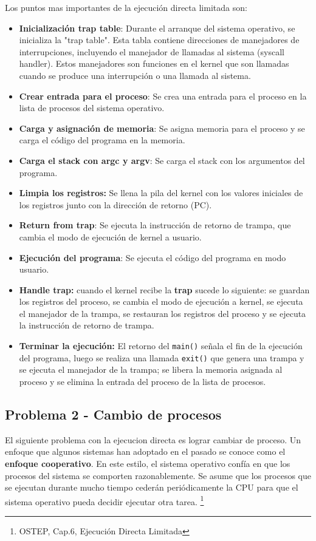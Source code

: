 \documentclass{article}
\begin{document}
Los puntos mas importantes de la ejecución directa limitada son:
\begin{itemize}
    \item \textbf{Inicialización trap table}: Durante el arranque del sistema operativo, se inicializa la "trap table". Esta tabla contiene direcciones de manejadores de interrupciones, incluyendo el manejador de llamadas al sistema (syscall handler). Estos manejadores son funciones en el kernel que son llamadas cuando se produce una interrupción o una llamada al sistema.
    \item \textbf{Crear entrada para el proceso}: Se crea una entrada para el proceso en la lista de procesos del sistema operativo.
    \item \textbf{Carga y asignación de memoria}: Se asigna memoria para el proceso y se carga el código del programa en la memoria.
    \item \textbf{Carga el stack con argc y argv}: Se carga el stack con los argumentos del programa.
    \item \textbf{Limpia los registros:} Se llena la pila del kernel con los valores iniciales de los registros junto con la dirección de retorno (PC).
    \item \textbf{Return from trap}: Se ejecuta la instrucción de retorno de trampa, que cambia el modo de ejecución de kernel a usuario.
    \item \textbf{Ejecución del programa}: Se ejecuta el código del programa en modo usuario.
    \item \textbf{Handle trap:} cuando el kernel recibe la \textbf{trap} sucede lo siguiente: se guardan los registros del proceso, se cambia el modo de ejecución a kernel, se ejecuta el manejador de la trampa, se restauran los registros del proceso y se ejecuta la instrucción de retorno de trampa.
    \item \textbf{Terminar la ejecución:} El retorno del \texttt{main()} señala el fin de la ejecución del programa, luego se realiza una llamada \texttt{exit()} que genera una trampa y se ejecuta el manejador de la trampa; se libera la memoria asignada al proceso y se elimina la entrada del proceso de la lista de procesos.
\end{itemize}

\subsection{Problema 2 - Cambio de procesos}
El siguiente problema con la ejecucion directa es lograr cambiar de proceso. Un enfoque que algunos sistemas han adoptado en el pasado se conoce como el \textbf{enfoque cooperativo}. En este estilo, el sistema operativo confía en que los procesos del sistema se comporten razonablemente. Se asume que los procesos que se ejecutan durante mucho tiempo cederán periódicamente la CPU para que el sistema operativo pueda decidir ejecutar otra tarea. \footnote{OSTEP, Cap.6, Ejecución Directa Limitada}
\end{document}
